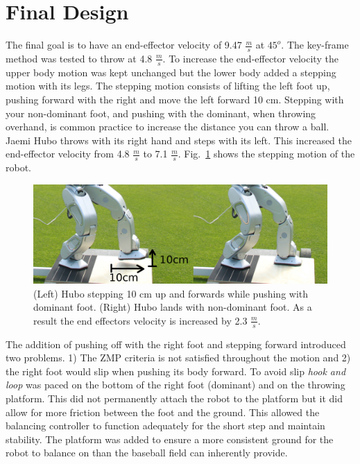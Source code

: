 \section{\bf Final Design}\label{sec:finalDesign}

The final goal is to have an end-effector velocity of 9.47 $\frac{m}{s}$ at $45^o$.  
The key-frame method was tested to throw at 4.8 $\frac{m}{s}$.  
To increase the end-effector velocity the upper body motion was kept unchanged but the lower body added a stepping motion with its legs.
The stepping motion consists of lifting the left foot up, pushing forward with the right and move the left forward 10 cm.  
Stepping with your non-dominant foot, and pushing with the dominant, when throwing overhand, is common practice to increase the distance you can throw a ball.  
Jaemi Hubo throws with its right hand and steps with its left.  
This increased the end-effector velocity from 4.8 $\frac{m}{s}$ to 7.1 $\frac{m}{s}$.
Fig.~\ref{fig:hubo-step} shows the stepping motion of the robot.

\begin{figure}[t]
  \centering
\includegraphics[width=1.0\columnwidth]{./pix/stepthrow.png}
  \caption{(Left) Hubo stepping 10 cm up and forwards while pushing with dominant foot.  (Right) Hubo lands with non-dominant foot. As a result the end effectors velocity is increased by 2.3 $\frac{m}{s}$.}
  \label{fig:hubo-step}
\end{figure}


The addition of pushing off with the right foot and stepping forward introduced two problems.  1) The ZMP criteria is not satisfied throughout the motion and 2) the right foot would slip when pushing its body forward.  
To avoid slip \textit{hook and loop} was paced on the bottom of the right foot (dominant) and on the throwing platform.  
This did not permanently attach the robot to the platform but it did allow for more friction between the foot and the ground.
This allowed the balancing controller to function adequately for the short step and maintain stability.
The platform was added to ensure a more consistent ground for the robot to balance on than the baseball field can inherently provide.



